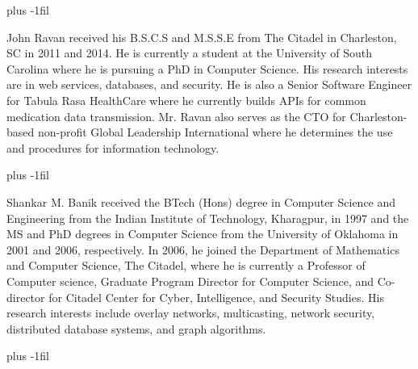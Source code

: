 \baselineskip plus -1fil
\begin{IEEEbiography}
    {John Ravan}
received his B.S.C.S and M.S.S.E from The Citadel in Charleston, SC in 2011 and 2014. He is currently a student at the University of South Carolina where he is pursuing a PhD in Computer Science. His research interests are in web services, databases, and security. He is also a Senior Software Engineer for Tabula Rasa HealthCare where he currently builds APIs for common medication data transmission. Mr. Ravan also serves as the CTO for Charleston-based non-profit Global Leadership International where he determines the use and procedures for information technology.
\end{IEEEbiography}
\baselineskip plus -1fil
\begin{IEEEbiography}
    {Shankar M. Banik}
received the BTech (Hons) degree in Computer Science and Engineering from the Indian Institute of Technology, Kharagpur, in 1997 and the MS and PhD degrees in Computer Science from the University of Oklahoma in 2001 and 2006, respectively. In 2006, he joined the Department of Mathematics and Computer Science, The Citadel, where he is currently a Professor of Computer science, Graduate Program Director for Computer Science, and Co-director for Citadel Center for Cyber, Intelligence, and Security Studies. His research interests include overlay networks, multicasting, network security, distributed database systems, and graph algorithms. 
\end{IEEEbiography}
\baselineskip plus -1fil
